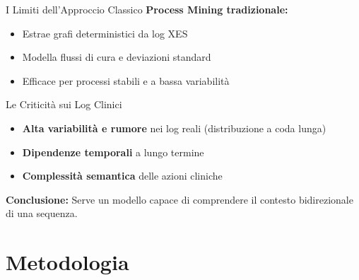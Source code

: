 \documentclass[aspectratio=169, 10pt]{beamer}
\begin{document}
\begin{frame}{I Limiti dell'Approccio Classico}
  \textbf{Process Mining tradizionale:}
  \begin{itemize}
    \item Estrae grafi deterministici da log XES
    \item Modella flussi di cura e deviazioni standard
    \item Efficace per processi stabili e a bassa variabilità
  \end{itemize}

  \vspace{1em}
  \begin{alertblock}{Le Criticità sui Log Clinici}
    \begin{itemize}
      \item \textbf{Alta variabilità e rumore} nei log reali (distribuzione a coda lunga)
      \item \textbf{Dipendenze temporali} a lungo termine
      \item \textbf{Complessità semantica} delle azioni cliniche
    \end{itemize}
  \end{alertblock}

  \vspace{1em}
  \textbf{Conclusione:} Serve un modello capace di comprendere 
  il \alert{contesto bidirezionale} di una sequenza.
\end{frame}

\section{Metodologia}
\end{document}
